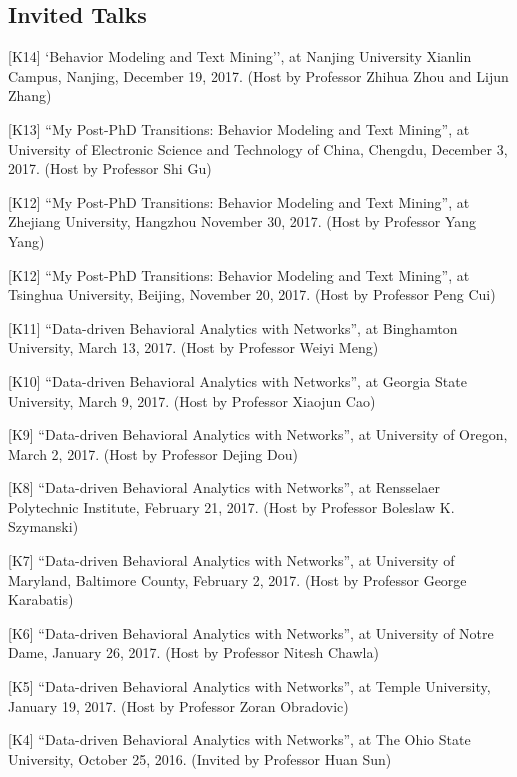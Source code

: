 \documentclass[margin, 9pt]{res}
\begin{document}
\begin{resume}

\section{Invited Talks}

[K14] `Behavior Modeling and Text Mining'', at Nanjing University Xianlin Campus, Nanjing, December 19, 2017. (Host by Professor Zhihua Zhou and Lijun Zhang)

[K13] ``My Post-PhD Transitions: Behavior Modeling and Text Mining'', at University of Electronic Science and Technology of China, Chengdu, December 3, 2017. (Host by Professor Shi Gu)

[K12] ``My Post-PhD Transitions: Behavior Modeling and Text Mining'', at Zhejiang University, Hangzhou November 30, 2017. (Host by Professor Yang Yang)

[K12] ``My Post-PhD Transitions: Behavior Modeling and Text Mining'', at Tsinghua University, Beijing, November 20, 2017. (Host by Professor Peng Cui)

[K11] ``Data-driven Behavioral Analytics with Networks'', at Binghamton University, March 13, 2017. (Host by Professor Weiyi Meng)

[K10] ``Data-driven Behavioral Analytics with Networks'', at Georgia State University, March 9, 2017. (Host by Professor Xiaojun Cao)

[K9] ``Data-driven Behavioral Analytics with Networks'', at University of Oregon, March 2, 2017. (Host by Professor Dejing Dou)

[K8] ``Data-driven Behavioral Analytics with Networks'', at Rensselaer Polytechnic Institute, February 21, 2017. (Host by Professor Boleslaw K. Szymanski)

[K7] ``Data-driven Behavioral Analytics with Networks'', at University of Maryland, Baltimore County, February 2, 2017. (Host by Professor George Karabatis)

[K6] ``Data-driven Behavioral Analytics with Networks'', at University of Notre Dame, January 26, 2017. (Host by Professor Nitesh Chawla)

[K5] ``Data-driven Behavioral Analytics with Networks'', at Temple University, January 19, 2017. (Host by Professor Zoran Obradovic)

[K4] ``Data-driven Behavioral Analytics with Networks'', at The Ohio State University, October 25, 2016. (Invited by Professor Huan Sun)


\end{resume}
\end{document}
